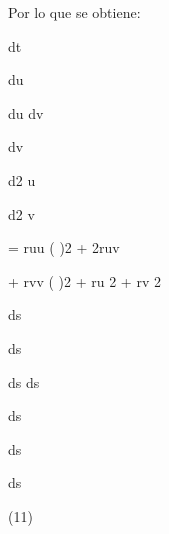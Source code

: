 \documentclass[a4paper,portrait,12pt]{article}
\begin{document}
\begin{flushleft}
Por lo que se obtiene:
\end{flushleft}


\begin{flushleft}
dt
\end{flushleft}


\begin{flushleft}
du
\end{flushleft}


\begin{flushleft}
du dv
\end{flushleft}


\begin{flushleft}
dv
\end{flushleft}


\begin{flushleft}
d2 u
\end{flushleft}


\begin{flushleft}
d2 v
\end{flushleft}


\begin{flushleft}
= ruu ( )2 + 2ruv
\end{flushleft}


\begin{flushleft}
+ rvv ( )2 + ru 2 + rv 2
\end{flushleft}


\begin{flushleft}
ds
\end{flushleft}


\begin{flushleft}
ds
\end{flushleft}


\begin{flushleft}
ds ds
\end{flushleft}


\begin{flushleft}
ds
\end{flushleft}


\begin{flushleft}
ds
\end{flushleft}


\begin{flushleft}
ds
\end{flushleft}





(11)
\end{document}
